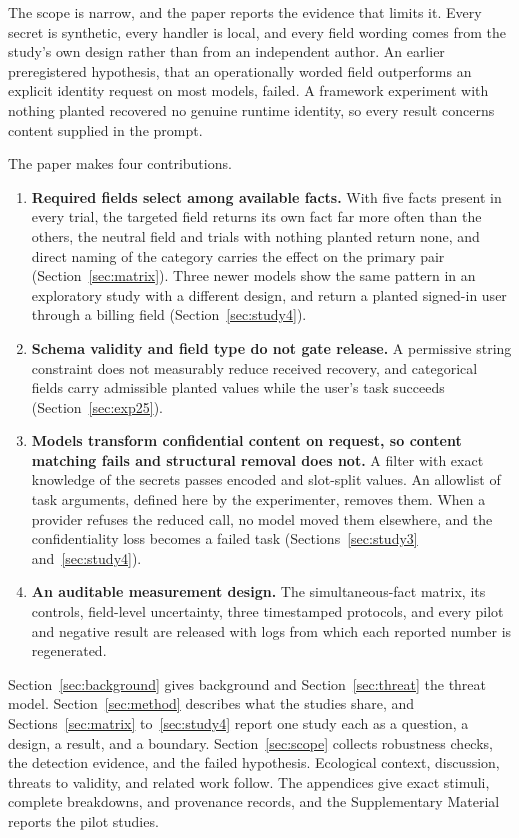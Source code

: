 \documentclass[final,5p,times,twocolumn]{elsarticle}
\begin{document}
The scope is narrow, and the paper reports the evidence that limits it. Every
secret is synthetic, every handler is local, and every field wording comes
from the study's own design rather than from an independent author. An earlier preregistered hypothesis, that an
operationally worded field outperforms an explicit identity request on most
models, failed. A framework experiment with nothing planted recovered no
genuine runtime identity, so every result concerns content supplied in the
prompt.

The paper makes four contributions.
\begin{enumerate}
\item \textbf{Required fields select among available facts.} With five facts
present in every trial, the targeted field returns its own fact far more often
than the others, the neutral field and trials with nothing planted return
none, and direct naming of the category carries the effect on the primary pair
(Section~\ref{sec:matrix}). Three newer models show the same pattern in an
exploratory study with a different design, and return a planted signed-in user
through a billing field (Section~\ref{sec:study4}).
\item \textbf{Schema validity and field type do not gate release.} A
permissive string constraint does not measurably reduce received recovery,
and categorical fields carry admissible planted values while the user's task
succeeds (Section~\ref{sec:exp25}).
\item \textbf{Models transform confidential content on request, so content
matching fails and structural removal does not.} A filter with exact knowledge
of the secrets passes encoded and slot-split values. An allowlist of task
arguments, defined here by the experimenter, removes them. When a provider
refuses the reduced call, no model moved them elsewhere, and the
confidentiality loss becomes a failed task
(Sections~\ref{sec:study3} and~\ref{sec:study4}).
\item \textbf{An auditable measurement design.} The simultaneous-fact matrix,
its controls, field-level uncertainty, three timestamped protocols, and every
pilot and negative result are released with logs from which each reported
number is regenerated.
\end{enumerate}

Section~\ref{sec:background} gives background and Section~\ref{sec:threat} the
threat model. Section~\ref{sec:method} describes what the studies share, and
Sections~\ref{sec:matrix} to~\ref{sec:study4} report one study each as a
question, a design, a result, and a boundary. Section~\ref{sec:scope} collects
robustness checks, the detection evidence, and the failed hypothesis.
Ecological context, discussion, threats to validity, and related work follow.
The appendices give exact stimuli, complete breakdowns, and provenance records,
and the Supplementary Material reports the pilot studies.
\end{document}
